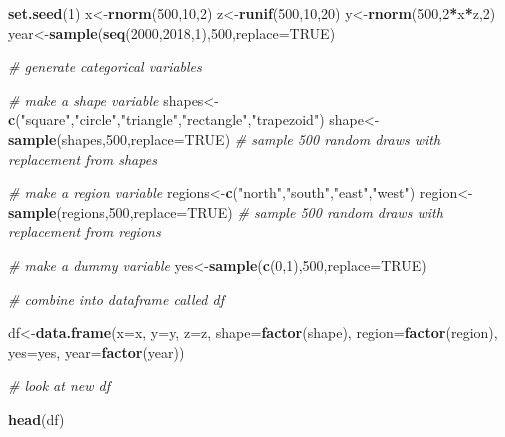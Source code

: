 \documentclass[]{book}
\newenvironment{Shaded}{\begin{snugshade}}{\end{snugshade}}
\newcommand{\KeywordTok}[1]{\textcolor[rgb]{0.13,0.29,0.53}{\textbf{#1}}}
\newcommand{\DataTypeTok}[1]{\textcolor[rgb]{0.13,0.29,0.53}{#1}}
\newcommand{\DecValTok}[1]{\textcolor[rgb]{0.00,0.00,0.81}{#1}}
\newcommand{\StringTok}[1]{\textcolor[rgb]{0.31,0.60,0.02}{#1}}
\newcommand{\CommentTok}[1]{\textcolor[rgb]{0.56,0.35,0.01}{\textit{#1}}}
\newcommand{\OtherTok}[1]{\textcolor[rgb]{0.56,0.35,0.01}{#1}}
\newcommand{\OperatorTok}[1]{\textcolor[rgb]{0.81,0.36,0.00}{\textbf{#1}}}
\newcommand{\NormalTok}[1]{#1}
\theoremstyle{definition}
\theoremstyle{definition}
\theoremstyle{definition}
\theoremstyle{remark}
\begin{document}
\begin{Shaded}
\begin{Highlighting}[]
\KeywordTok{set.seed}\NormalTok{(}\DecValTok{1}\NormalTok{)}
\NormalTok{x<-}\KeywordTok{rnorm}\NormalTok{(}\DecValTok{500}\NormalTok{,}\DecValTok{10}\NormalTok{,}\DecValTok{2}\NormalTok{)}
\NormalTok{z<-}\KeywordTok{runif}\NormalTok{(}\DecValTok{500}\NormalTok{,}\DecValTok{10}\NormalTok{,}\DecValTok{20}\NormalTok{)}
\NormalTok{y<-}\KeywordTok{rnorm}\NormalTok{(}\DecValTok{500}\NormalTok{,}\DecValTok{2}\OperatorTok{*}\NormalTok{x}\OperatorTok{*}\NormalTok{z,}\DecValTok{2}\NormalTok{)}
\NormalTok{year<-}\KeywordTok{sample}\NormalTok{(}\KeywordTok{seq}\NormalTok{(}\DecValTok{2000}\NormalTok{,}\DecValTok{2018}\NormalTok{,}\DecValTok{1}\NormalTok{),}\DecValTok{500}\NormalTok{,}\DataTypeTok{replace=}\OtherTok{TRUE}\NormalTok{)}

\CommentTok{# generate categorical variables}

\CommentTok{# make a shape variable }
\NormalTok{shapes<-}\KeywordTok{c}\NormalTok{(}\StringTok{"square"}\NormalTok{,}\StringTok{"circle"}\NormalTok{,}\StringTok{"triangle"}\NormalTok{,}\StringTok{"rectangle"}\NormalTok{,}\StringTok{"trapezoid"}\NormalTok{)}
\NormalTok{shape<-}\KeywordTok{sample}\NormalTok{(shapes,}\DecValTok{500}\NormalTok{,}\DataTypeTok{replace=}\OtherTok{TRUE}\NormalTok{) }\CommentTok{# sample 500 random draws with replacement from shapes}

\CommentTok{# make a region variable }
\NormalTok{regions<-}\KeywordTok{c}\NormalTok{(}\StringTok{"north"}\NormalTok{,}\StringTok{"south"}\NormalTok{,}\StringTok{"east"}\NormalTok{,}\StringTok{"west"}\NormalTok{)}
\NormalTok{region<-}\KeywordTok{sample}\NormalTok{(regions,}\DecValTok{500}\NormalTok{,}\DataTypeTok{replace=}\OtherTok{TRUE}\NormalTok{) }\CommentTok{# sample 500 random draws with replacement from regions}

\CommentTok{# make a dummy variable }
\NormalTok{yes<-}\KeywordTok{sample}\NormalTok{(}\KeywordTok{c}\NormalTok{(}\DecValTok{0}\NormalTok{,}\DecValTok{1}\NormalTok{),}\DecValTok{500}\NormalTok{,}\DataTypeTok{replace=}\OtherTok{TRUE}\NormalTok{) }

\CommentTok{# combine into dataframe called df}

\NormalTok{df<-}\KeywordTok{data.frame}\NormalTok{(}\DataTypeTok{x=}\NormalTok{x,}
               \DataTypeTok{y=}\NormalTok{y,}
               \DataTypeTok{z=}\NormalTok{z,}
               \DataTypeTok{shape=}\KeywordTok{factor}\NormalTok{(shape),}
               \DataTypeTok{region=}\KeywordTok{factor}\NormalTok{(region),}
               \DataTypeTok{yes=}\NormalTok{yes,}
               \DataTypeTok{year=}\KeywordTok{factor}\NormalTok{(year))}

\CommentTok{# look at new df}

\KeywordTok{head}\NormalTok{(df)}
\end{Highlighting}
\end{Shaded}
\end{document}
